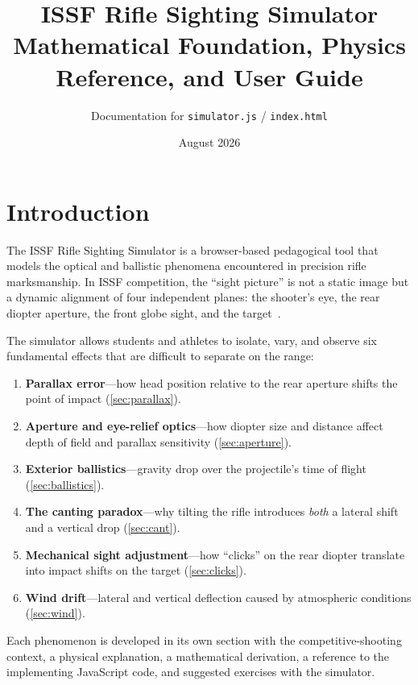 \documentclass[11pt]{article}
\title{\textbf{ISSF Rifle Sighting Simulator}\\[4pt]
       \large Mathematical Foundation, Physics Reference, and User Guide}
\author{Documentation for \texttt{simulator.js} / \texttt{index.html}}
\date{August 2026}
\begin{document}
\maketitle
\tableofcontents
\clearpage

\section{Introduction}\label{sec:intro}

The ISSF Rifle Sighting Simulator is a browser-based pedagogical tool
that models the optical and ballistic phenomena encountered in
precision rifle marksmanship.  In ISSF competition, the ``sight
picture'' is not a static image but a dynamic alignment of four
independent planes: the shooter's eye, the rear diopter aperture, the
front globe sight, and the target~\cite{nra,issf}.

The simulator allows students and athletes to isolate, vary, and
observe six fundamental effects that are difficult to separate on the
range:

\begin{enumerate}[nosep]
  \item \textbf{Parallax error}---how head position relative to the
        rear aperture shifts the point of impact
        (\cref{sec:parallax}).
  \item \textbf{Aperture and eye-relief optics}---how diopter size and
        distance affect depth of field and parallax sensitivity
        (\cref{sec:aperture}).
  \item \textbf{Exterior ballistics}---gravity drop over the
        projectile's time of flight (\cref{sec:ballistics}).
  \item \textbf{The canting paradox}---why tilting the rifle
        introduces \emph{both} a lateral shift and a vertical drop
        (\cref{sec:cant}).
  \item \textbf{Mechanical sight adjustment}---how ``clicks'' on the
        rear diopter translate into impact shifts on the target
        (\cref{sec:clicks}).
  \item \textbf{Wind drift}---lateral and vertical deflection caused
        by atmospheric conditions (\cref{sec:wind}).
\end{enumerate}

\noindent Each phenomenon is developed in its own section with the
competitive-shooting context, a physical explanation, a mathematical
derivation, a reference to the implementing JavaScript code, and
suggested exercises with the simulator.
\end{document}
